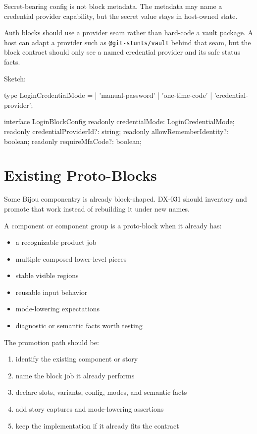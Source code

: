 Secret-bearing config is not block metadata. The metadata may name a credential provider capability, but the secret value stays in host-owned state.

Auth blocks should use a provider seam rather than hard-code a vault package. A host can adapt a provider such as \texttt{@\allowbreak{}g\allowbreak{}i\allowbreak{}t\allowbreak{}-\allowbreak{}s\allowbreak{}t\allowbreak{}u\allowbreak{}n\allowbreak{}t\allowbreak{}s\allowbreak{}/\allowbreak{}v\allowbreak{}a\allowbreak{}u\allowbreak{}l\allowbreak{}t} behind that seam, but the block contract should only see a named credential provider and its safe status facts.

Sketch:

\begin{CodeBlock}
type LoginCredentialMode =
  | 'manual-password'
  | 'one-time-code'
  | 'credential-provider';

interface LoginBlockConfig {
  readonly credentialMode: LoginCredentialMode;
  readonly credentialProviderId?: string;
  readonly allowRememberIdentity?: boolean;
  readonly requireMfaCode?: boolean;
}
\end{CodeBlock}

\section{Existing Proto-Blocks}\label{record-128-existing-proto-blocks}

Some Bijou componentry is already block-shaped. DX-031 should inventory and promote that work instead of rebuilding it under new names.

A component or component group is a proto-block when it already has:

\begin{itemize}
\tightlist
\item
  a recognizable product job
\item
  multiple composed lower-level pieces
\item
  stable visible regions
\item
  reusable input behavior
\item
  mode-lowering expectations
\item
  diagnostic or semantic facts worth testing
\end{itemize}

The promotion path should be:

\begin{enumerate}
\def\labelenumi{\arabic{enumi}.}
\tightlist
\item
  identify the existing component or story
\item
  name the block job it already performs
\item
  declare slots, variants, config, modes, and semantic facts
\item
  add story captures and mode-lowering assertions
\item
  keep the implementation if it already fits the contract
\end{enumerate}

